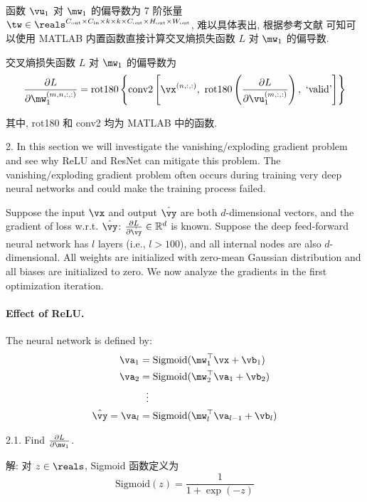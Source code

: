 \documentclass[openany]{ctexbook}
\theoremstyle{kaiti}
\theoremstyle{normal}
\begin{document}
函数 $\vu_1$ 对 $\mw_1$ 的偏导数为 7 阶张量 $\tw\in\reals^{C_{\text{out}}\times C_{\text{in}}\times k\times k\times C_{\text{out}}\times H_{\text{out}}\times W_{\text{out}}}$, 难以具体表出, 根据参考文献 \cite{notecnn} 可知可以使用 MATLAB 内置函数直接计算交叉熵损失函数 $L$ 对 $\mw_1$ 的偏导数.

交叉熵损失函数 $L$ 对 $\mw_1$ 的偏导数为
\begin{equation}
  \frac{\partial L}{\partial\mw_1^{(m,n,:,:)}}
  =\mathrm{rot180}\left\{\mathrm{conv2}\left[\vx^{(n,:,:)},~\mathrm{rot180}\left(\frac{\partial L}{\partial\vu_1^{(m,:,:)}}\right),~\text{`valid'}\right]\right\}
\end{equation}

其中, rot180 和 conv2 均为 MATLAB 中的函数.

2. In this section we will investigate the vanishing/exploding gradient problem and see why ReLU and ResNet can mitigate this problem. The vanishing/exploding gradient problem often occurs during training very deep neural networks and could make the training process failed.

Suppose the input $\vx$ and output $\hat{\vy}$ are both $d$-dimensional vectors, and the gradient of loss w.r.t. $\hat{\vy}$: $\frac{\partial L}{\partial \hat{\vy}}\in\mathbb R^d$ is known. Suppose the deep feed-forward neural network has $l$ layers (i.e., $l>100$), and all internal nodes are also $d$-dimensional. All weights are initialized with zero-mean Gaussian distribution and all biases are initialized to zero. We now analyze the gradients in the first optimization iteration.

\paragraph{Effect of ReLU.} The neural network is defined by: 
\begin{equation}
  \begin{aligned}
    \va_1&=\mathrm{Sigmoid}(\mw_1^\top\vx+\vb_1)\\
    \va_2&=\mathrm{Sigmoid}(\mw_2^\top\va_1+\vb_2)\\
    &~~\vdots\\
    \hat{\vy}=\va_l&=\mathrm{Sigmoid}(\mw_l^\top\va_{l-1}+\vb_l)
  \end{aligned}
\end{equation}

2.1. Find $\frac{\partial L}{\partial \mw_1}$.

解: 对 $z\in\reals$, Sigmoid 函数定义为
\begin{equation}
  \mathrm{Sigmoid}(z)=\frac{1}{1+\exp(-z)}
\end{equation}
\end{document}
